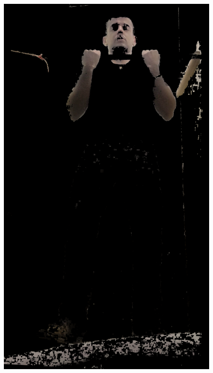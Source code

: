 \begin{figure}[H]
\begin{minipage}{\sizeImg\textwidth}
            \includegraphics[width=\textwidth]{figuras/ultrapassar_barra/134_skin.png}
        \end{minipage}
\end{figure}
